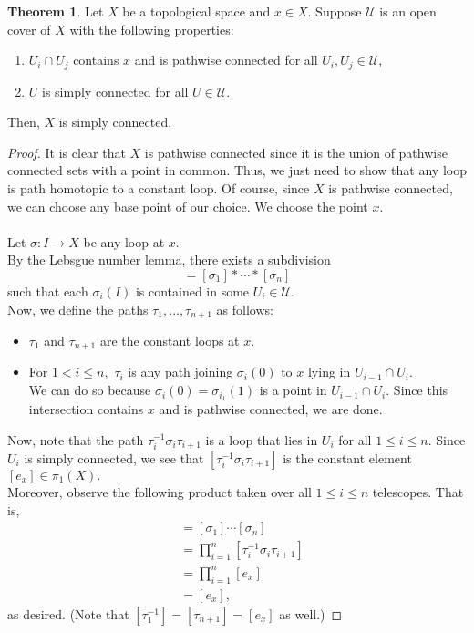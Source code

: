 \documentclass[12pt]{article}
\theoremstyle{definition}
\newtheorem{thm}{Theorem}
\numberwithin{thm}{section}
\begin{document}
\begin{thm}
	Let $X$ be a topological space and $x \in X.$ Suppose $\mathcal{U}$ is an open cover of $X$ with the following properties:
	\begin{enumerate}
		\item $U_i \cap U_j$ contains $x$ and is pathwise connected for all $U_i, U_j \in \mathcal{U}$,
		\item $U$ is simply connected for all $U \in \mathcal{U}.$
	\end{enumerate}
	Then, $X$ is simply connected.
\end{thm}
\begin{proof} 
	It is clear that $X$ is pathwise connected since it is the union of pathwise connected sets with a point in common. Thus, we just need to show that any loop is path homotopic to a constant loop. Of course, since $X$ is pathwise connected, we can choose any base point of our choice. We choose the point $x.$ \\~\\
	Let $\sigma:I \to X$ be any loop at $x.$\\
	By the Lebsgue number lemma, there exists a subdivision
	\begin{equation*} 
		[\sigma] = [\sigma_1]*\cdots*[\sigma_n]
	\end{equation*}
	such that each $\sigma_i(I)$ is contained in some $U_i \in \mathcal{U}.$ \\
	Now, we define the paths $\tau_1, \ldots, \tau_{n+1}$ as follows:
	\begin{itemize}
		\item $\tau_1$ and $\tau_{n+1}$ are the constant loops at $x.$
		\item For $1 < i \le n,$ $\tau_i$ is any path joining $\sigma_i(0)$ to $x$ lying in $U_{i-1} \cap U_i.$ \\
		We can do so because $\sigma_i(0) = \sigma_{i_1}(1)$ is a point in $U_{i-1} \cap U_i.$ Since this intersection contains $x$ and is pathwise connected, we are done.
	\end{itemize}
	Now, note that the path $\tau_i^{-1}\sigma_i\tau_{i+1}$ is a loop that lies in $U_i$ for all $1 \le i \le n.$ Since $U_i$ is simply connected, we see that $[\tau_i^{-1}\sigma_i\tau_{i+1}]$ is the constant element $[e_{x}] \in \pi_1(X).$\\
	Moreover, observe the following product taken over all $1 \le i \le n$ telescopes. That is,
	\begin{align*} 
		[\sigma] &= [\sigma_1]\cdots[\sigma_n]\\
		&= \prod_{i = 1}^{n}[\tau_i^{-1}\sigma_i\tau_{i+1}]\\
		&= \prod_{i = 1}^{n}[e_x]\\
		&= [e_x],
	\end{align*}
	as desired. (Note that $[\tau_1^{-1}] = [\tau_{n+1}] = [e_x]$ as well.)
\end{proof}
\end{document}
